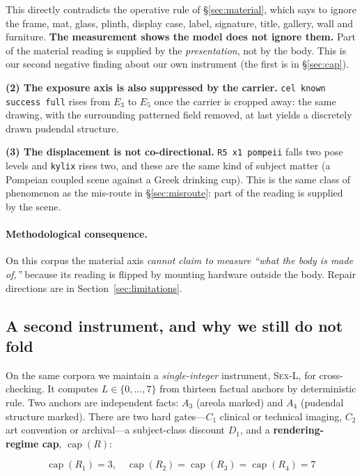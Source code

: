 \documentclass[11pt]{article}
\newcommand{\axe}{E}
\newcommand{\sexl}{\textsc{Sex-L}}
\begin{document}
This directly contradicts the operative rule of \S\ref{sec:material}, which
says to ignore the frame, mat, glass, plinth, display case, label, signature,
title, gallery, wall and furniture. \textbf{The measurement shows the model
does not ignore them.} Part of the material reading is supplied by the
\emph{presentation}, not by the body. This is our second negative finding about
our own instrument (the first is in \S\ref{sec:cap}).

\textbf{(2) The exposure axis is also suppressed by the carrier.}
\texttt{cel known success full} rises from $\axe_3$ to $\axe_5$ once the
carrier is cropped away: the same drawing, with the surrounding patterned field
removed, at last yields a discretely drawn pudendal structure.

\textbf{(3) The displacement is not co-directional.} \texttt{R5 x1 pompeii}
falls two pose levels and \texttt{kylix} rises two, and these are the same kind
of subject matter (a Pompeian coupled scene against a Greek drinking cup). This
is the same class of phenomenon as the mis-route in \S\ref{sec:misroute}: part
of the reading is supplied by the scene.

\paragraph{Methodological consequence.}
On this corpus the material axis \emph{cannot claim to measure ``what the body
is made of,''} because its reading is flipped by mounting hardware outside the
body. Repair directions are in Section~\ref{sec:limitations}.

\subsection{A second instrument, and why we still do not fold}
\label{sec:sexl}

On the same corpora we maintain a \emph{single-integer} instrument, \sexl,
for cross-checking. It computes $L\in\{0,\dots,7\}$ from thirteen factual
anchors by deterministic rule. Two anchors are independent facts: $A_3$
(areola marked) and $A_4$ (pudendal structure marked). There are two hard
gates---$C_1$ clinical or technical imaging, $C_2$ art convention or
archival---a subject-class discount $D_1$, and a \textbf{rendering-regime cap},
$\operatorname{cap}(R)$:

\begin{equation}
\label{eq:cap}
\operatorname{cap}(R_1)=3,\quad
\operatorname{cap}(R_2)=\operatorname{cap}(R_3)=\operatorname{cap}(R_4)=7
\end{equation}
\end{document}
